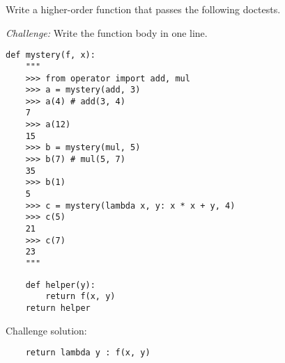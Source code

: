 \begin{blocksection}
\question Write a higher-order function that passes the following doctests.

\emph{Challenge:} Write the function body in one line.

\begin{lstlisting}
def mystery(f, x):
    """
    >>> from operator import add, mul
    >>> a = mystery(add, 3)
    >>> a(4) # add(3, 4)
    7
    >>> a(12)
    15
    >>> b = mystery(mul, 5)
    >>> b(7) # mul(5, 7)
    35
    >>> b(1)
    5
    >>> c = mystery(lambda x, y: x * x + y, 4)
    >>> c(5)
    21
    >>> c(7)
    23
    """
\end{lstlisting}

\begin{solution}[1in]
\begin{lstlisting}
    def helper(y):
        return f(x, y)
    return helper
\end{lstlisting}

Challenge solution:

\begin{lstlisting}
    return lambda y : f(x, y)
\end{lstlisting}
\end{solution}
\end{blocksection}
